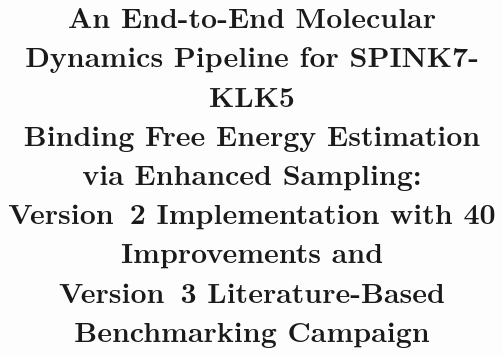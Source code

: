 \documentclass[conference]{IEEEtran}
\begin{document}
\title{An End-to-End Molecular Dynamics Pipeline for SPINK7-KLK5\\
Binding Free Energy Estimation via Enhanced Sampling:\\
Version~2 Implementation with 40 Improvements and\\
Version~3 Literature-Based Benchmarking Campaign}

\author{
}

\IEEEoverridecommandlockouts
{}

\maketitle
\end{document}

